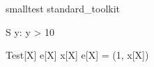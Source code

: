 \begin{zsection}
\SECTION smalltest \parents standard\_toolkit
\end{zsection}

\begin{schema}{S}
   y: \nat
\where
   y > 10
\end{schema}



\begin{theorem}{Test}[X]
    e[X] \in \langle x[X] \rangle  \iff  e[X] = (1, x[X])
\end{theorem}



